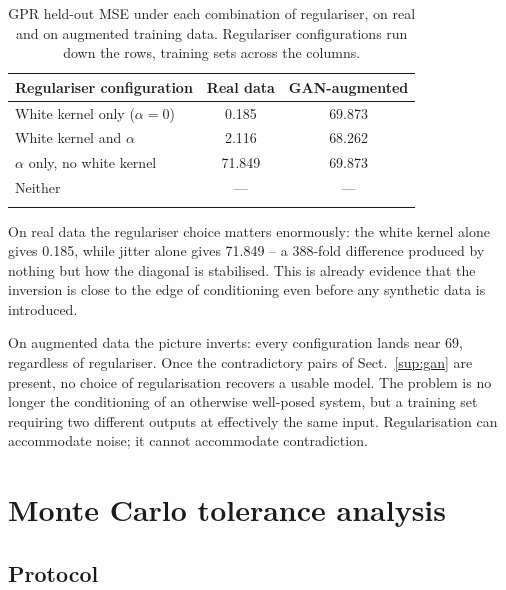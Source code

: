 \documentclass[pdflatex,sn-basic,Numbered]{sn-jnl}
\begin{document}
\begin{table}[h]
\caption{GPR held-out MSE under each combination of regulariser, on real and on
augmented training data. Regulariser configurations run down the rows, training
sets across the columns.}\label{tab:gpr}
\begin{tabular*}{\textwidth}{@{\extracolsep\fill}lcc}
\toprule
Regulariser configuration & Real data & GAN-augmented \\
\midrule
White kernel only ($\alpha = 0$)       & 0.185  & 69.873 \\
White kernel and $\alpha$              & 2.116  & 68.262 \\
$\alpha$ only, no white kernel         & 71.849 & 69.873 \\
Neither                                & ---    & ---    \\
\botrule
\end{tabular*}
\end{table}

On real data the regulariser choice matters enormously: the white kernel alone
gives 0.185, while jitter alone gives 71.849 -- a 388-fold difference produced
by nothing but how the diagonal is stabilised. This is already evidence that the
inversion is close to the edge of conditioning even before any synthetic data is
introduced.

On augmented data the picture inverts: every configuration lands near 69,
regardless of regulariser. Once the contradictory pairs of Sect.~\ref{sup:gan}
are present, no choice of regularisation recovers a usable model. The problem is
no longer the conditioning of an otherwise well-posed system, but a training set
requiring two different outputs at effectively the same input. Regularisation can
accommodate noise; it cannot accommodate contradiction.

\section{Monte Carlo tolerance analysis}\label{sup:mc}

\subsection{Protocol}
\end{document}
